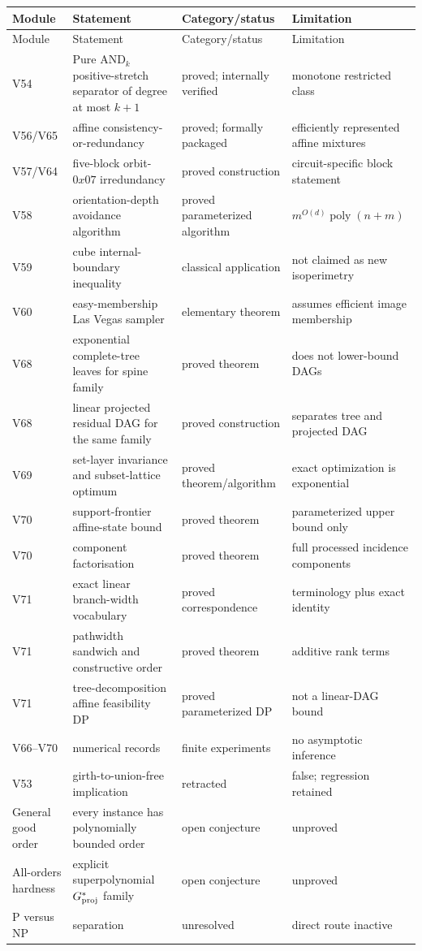 \documentclass[11pt]{article}
\begin{document}
\begin{longtable}{>{\raggedright\arraybackslash}p{}>{\raggedright\arraybackslash}p{}>{\raggedright\arraybackslash}p{}>{\raggedright\arraybackslash}p{}}
\toprule
Module & Statement & Category/status & Limitation \\
\midrule
\endfirsthead
\toprule
Module & Statement & Category/status & Limitation \\
\midrule
\endhead
V54 & Pure $\mathrm{AND}_k$ positive-stretch separator of degree at most $k+1$ & proved; internally verified & monotone restricted class \\
V56/V65 & affine consistency-or-redundancy & proved; formally packaged & efficiently represented affine mixtures \\
V57/V64 & five-block orbit-$0x07$ irredundancy & proved construction & circuit-specific block statement \\
V58 & orientation-depth avoidance algorithm & proved parameterized algorithm & $m^{O(d)}\operatorname{poly}(n+m)$ \\
V59 & cube internal-boundary inequality & classical application & not claimed as new isoperimetry \\
V60 & easy-membership Las Vegas sampler & elementary theorem & assumes efficient image membership \\
V68 & exponential complete-tree leaves for spine family & proved theorem & does not lower-bound DAGs \\
V68 & linear projected residual DAG for the same family & proved construction & separates tree and projected DAG \\
V69 & set-layer invariance and subset-lattice optimum & proved theorem/algorithm & exact optimization is exponential \\
V70 & support-frontier affine-state bound & proved theorem & parameterized upper bound only \\
V70 & component factorisation & proved theorem & full processed incidence components \\
V71 & exact linear branch-width vocabulary & proved correspondence & terminology plus exact identity \\
V71 & pathwidth sandwich and constructive order & proved theorem & additive rank terms \\
V71 & tree-decomposition affine feasibility DP & proved parameterized DP & not a linear-DAG bound \\
V66--V70 & numerical records & finite experiments & no asymptotic inference \\
V53 & girth-to-union-free implication & retracted & false; regression retained \\
General good order & every instance has polynomially bounded order & open conjecture & unproved \\
All-orders hardness & explicit superpolynomial $G^*_{\rm proj}$ family & open conjecture & unproved \\
P versus NP & separation & unresolved & direct route inactive \\
\bottomrule
\end{longtable}
\end{document}
